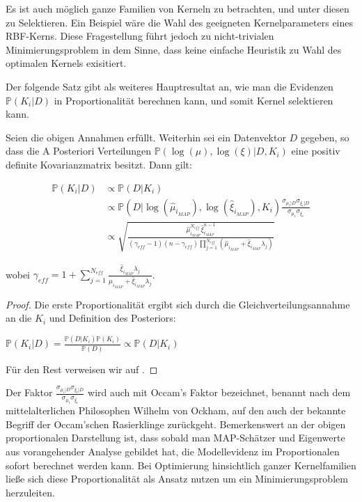 Es ist auch möglich ganze Familien von Kerneln zu betrachten, und unter diesen zu Selektieren. Ein Beispiel wäre die Wahl des geeigneten Kernelparameters eines RBF-Kerns. Diese Fragestellung führt jedoch zu nicht-trivialen Minimierungsproblem in dem Sinne, dass keine einfache Heuristik zu Wahl des optimalen Kernels exisitiert.

Der folgende Satz gibt als weiteres Hauptresultat an, wie man die Evidenzen $\mathbb{P}(K_i \vert D)$ in Proportionalität berechnen kann, und somit Kernel selektieren kann.


\begin{theorem}
Seien die obigen Annahmen erfüllt. Weiterhin sei ein Datenvektor $D$ gegeben, so dass die A Posteriori Verteilungen $\mathbb{P}(\log(\mu),\log(\xi) \vert D, K_i)$ eine positiv definite Kovarianzmatrix besitzt. Dann gilt:

\begin{align*}
	\mathbb{P}(K_i \vert D) 
	&\propto \mathbb{P}(D \vert K_i)\\
 	&\propto \mathbb{P}(D \vert \log(\hat{\mu}_{i_{MAP}}), \log(\hat{\xi}_{i_{MAP}}), 			K_i)\frac{\sigma_{\mu_i\vert D} \sigma_{\xi_i\vert D}}{\sigma_{\mu_i} 						\sigma_{\xi_i}}\\
	&\propto \sqrt{\frac{\hat{\mu}^{N_{eff}}_{i_{MAP}} \hat{\xi}^{n-1}_{i_{MAP}}}				{(\gamma_{eff}-1)(n - \gamma_{eff}) \prod_{j=1}^{N_{eff}}(\hat{\mu}_{i_{MAP}} + 			\hat{\xi}_{i_{MAP}}\lambda_j)}}
\end{align*}

wobei $\gamma_{eff} = 1 + \sum_{j=1}^{N_{eff}}\frac{\hat{\xi}_{i_{MAP}}\lambda_j}{\hat{\mu}_{i_{MAP}} + \hat{\xi}_{i_{MAP}}\lambda_j}$.

\end{theorem}

\begin{proof}
Die erste Proportionalität ergibt sich durch die Gleichverteilungsannahme an die $K_i$ und Definition des Posteriors:

\begin{center}
	$\mathbb{P}(K_i \vert D) = \frac{\mathbb{P}(D\vert K_i)\mathbb{P}(K_i)}{\mathbb{P}			(D)}
	\propto \mathbb{P}(D \vert K_i)$
\end{center}
Für den Rest verweisen wir auf \cite{LS-SVM}.
\end{proof}

Der Faktor $\frac{\sigma_{\mu_i\vert D} \sigma_{\xi_i\vert D}}{\sigma_{\mu_i} 						\sigma_{\xi_i}}$ wird auch mit Occam's Faktor bezeichnet, benannt nach dem mittelalterlichen Philosophen Wilhelm von Ockham, auf den auch der bekannte Begriff der Occam'schen Rasierklinge zurückgeht. Bemerkenswert an der obigen proportionalen Darstellung ist, dass sobald man MAP-Schätzer und Eigenwerte aus vorangehender Analyse gebildet hat, die Modellevidenz im Proportionalen sofort berechnet werden kann. Bei Optimierung hinsichtlich ganzer Kernelfamilien ließe sich diese Proportionalität als Ansatz nutzen um ein Minimierungsproblem herzuleiten.

